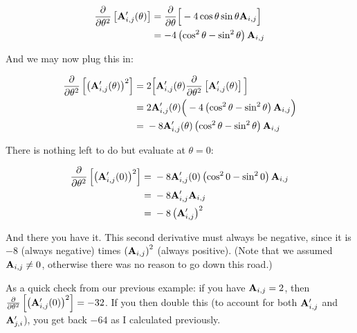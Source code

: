 \begin{equation*}
  \begin{split}
      \frac{\partial }{\partial \theta^2} \left[ \mathbf{A}'_{i, j}(\theta) \right]
    &=
      \frac{\partial }{\partial \theta} \Big[ -4\cos\theta\sin\theta \mathbf{A}_{i, j} \Big] \\
    &=
      -4 \left( \cos^2\theta - \sin^2\theta \right) \mathbf{A}_{i, j}
  \end{split}
\end{equation*}

And we may now plug this in:

\begin{equation*}
  \begin{split}
      \frac{\partial }{\partial \theta^2} \left[ \left( \mathbf{A}'_{i, j}(\theta) \right)^2 \right]
    ={}&
      2 \Big[
        \mathbf{A}'_{i, j}(\theta)
        \frac{\partial }{\partial \theta^2} \left[ \mathbf{A}'_{i, j}(\theta) \right]
      \Big] \\
    ={}&
      2 \mathbf{A}'_{i, j}(\theta) \Big(
        -4 \left( \cos^2\theta - \sin^2\theta \right) \mathbf{A}_{i, j}
      \Big) \\
    ={}&
      -8 \mathbf{A}'_{i, j}(\theta)
      \left( \cos^2\theta - \sin^2\theta \right) \mathbf{A}_{i, j} \\
  \end{split}
\end{equation*}

There is nothing left to do but evaluate at $\theta = 0$:

\begin{equation*}
  \begin{split}
      \frac{\partial }{\partial \theta^2} \left[ \left( \mathbf{A}'_{i, j}(0) \right)^2 \right]
    ={}&
      -8 \mathbf{A}'_{i, j}(0)
      \left( \cos^2 0 - \sin^2 0 \right) \mathbf{A}_{i, j} \\
    ={}&
      -8 \mathbf{A}'_{i, j} \mathbf{A}_{i, j} \\
    ={}&
      -8 \left( \mathbf{A}'_{i, j} \right)^2 \\
  \end{split}
\end{equation*}

And there you have it. This second derivative must always be negative,
since it is $-8$ (always negative) times $\left( \mathbf{A}_{i, j} \right)^2$
(always positive). (Note that we assumed $\mathbf{A}_{i, j} \ne 0$, otherwise
there was no reason to go down this road.)

As a quick check from our previous example: if you have $\mathbf{A}_{i, j} =
2$, then $\frac{\partial }{\partial \theta^2} \left[ \left( \mathbf{A}'_{i, j}(0) \right)^2 \right] =
-32$. If you then double this (to account for both $\mathbf{A}'_{i, j}$ and
$\mathbf{A}'_{j, i}$), you get back $-64$ as I calculated previously.

